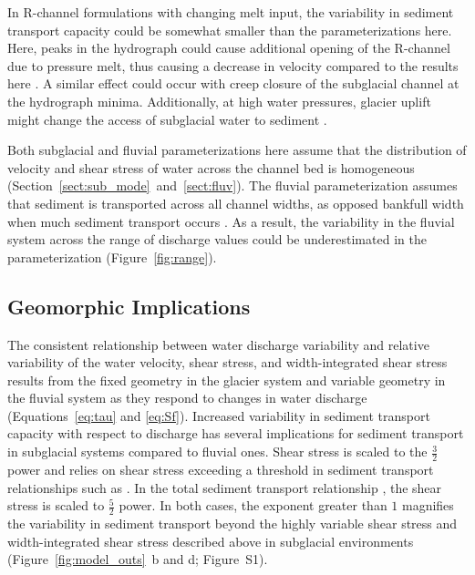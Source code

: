 \documentclass[11pt]{article}
\begin{document}
\begin{spacing}{1}
          In R-channel formulations with changing melt input, the variability in sediment transport capacity could be somewhat smaller than the parameterizations here.
          Here, peaks in the hydrograph could cause additional opening of the R-channel  due to pressure melt, thus causing a decrease in velocity compared to the results here \citep{rothlisberger1972}.
          A similar effect could occur with creep closure of the subglacial channel at the hydrograph minima.
          Additionally, at high water pressures, glacier uplift might change the access of subglacial water to sediment \citep{iken1993}. 

          Both subglacial and fluvial parameterizations here assume that the distribution of velocity and shear stress of water across the channel bed is homogeneous (Section~\ref{sect:sub_mode}~and~\ref{sect:fluv}). 
          The fluvial parameterization assumes that sediment is transported across all channel widths, as opposed bankfull width when much sediment transport occurs \citep{wolman1960}.
          As a result, the variability in the fluvial system across the range of discharge values could be underestimated in the parameterization (Figure~\ref{fig:range}).
        
        
          
          \subsection{Geomorphic Implications}
          \label{sect:GI}
          The consistent relationship between water discharge variability and relative variability of the water velocity, shear stress, and width-integrated shear stress results from the fixed geometry in the glacier system and variable geometry in the fluvial system as they respond to changes in water discharge (Equations~\ref{eq:tau} and \ref{eq:Sf}).
          Increased variability in sediment transport capacity with respect to discharge has several implications for sediment transport in subglacial systems compared to fluvial ones.
          Shear stress is scaled to the $\frac{3}{2}$ power  and relies on shear stress exceeding a threshold in sediment transport relationships  such as \citet{meyer1948}.
          In the total sediment transport relationship \citet{engelund1967}, the shear stress is scaled to $\frac{5}{2}$ power.
          In both cases, the exponent greater than $1$ magnifies the variability in sediment transport beyond the highly variable shear stress and width-integrated shear stress described above in subglacial environments (Figure~\ref{fig:model_outs}\, b and d; Figure~S1).


\end{spacing}
\end{document}
